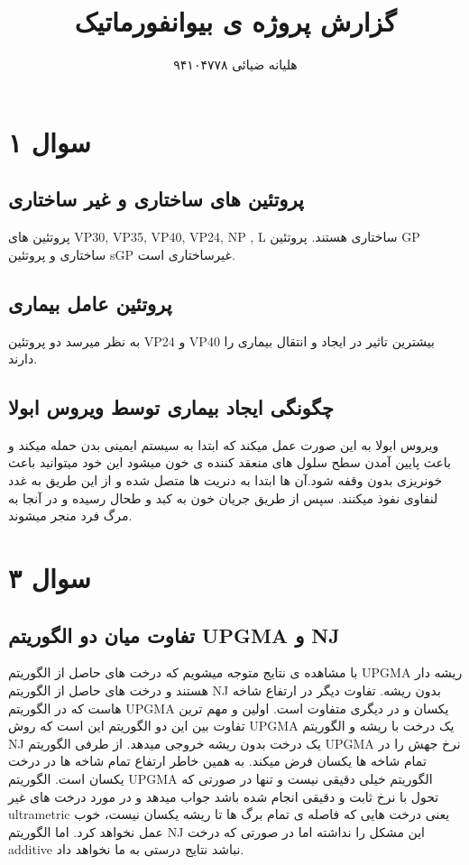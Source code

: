 \documentclass[11pt, oneside]{article}
\title{گزارش پروژه ی بیوانفورماتیک}
\author{هلیانه ضیائی	۹۴۱۰۴۷۷۸}
\begin{document}
\maketitle
\section*{سوال ۱}
\subsection*{پروتئین های ساختاری و غیر ساختاری}
پروتئين های VP30, VP35, VP40, VP24, NP , L ساختاری هستند.
\hyperlink{}{\cite{a6, a8}}
پروتئین GP ساختاری و پروتئین sGP غیرساختاری است.
\cite{a7}
\subsection*{پروتئین عامل بیماری}
به نظر میرسد دو پروتئین VP24 و VP40 بیشترین تاثیر در ایجاد و انتقال بیماری را دارند.
\hyperlink{}{\cite{a9, a8}}
\subsection*{چگونگی ایجاد بیماری توسط ویروس ابولا}
ویروس ابولا به این صورت عمل میکند که ابتدا به سیستم ایمینی بدن حمله میکند و باعث پایین آمدن سطح سلول های منعقد کننده ی خون میشود این خود میتوانید باعث خونریزی بدون وقفه شود.آن ها ابتدا به دنریت ها متصل شده و از این طریق به غدد لنفاوی نفوذ میکنند. سپس از طریق جریان خون به کبد و طحال رسیده و در آنجا به مرگ فرد منجر میشوند.
\hyperlink{}{\cite{a10, a11}}
\section*{سوال ۳}
\subsection*{تفاوت میان دو الگوریتم UPGMA و NJ}
با مشاهده ی نتایج متوجه میشویم که درخت های حاصل از الگوریتم UPGMA ریشه دار هستند و درخت های حاصل از الگوریتم NJ بدون ریشه. تفاوت دیگر در ارتفاع شاخه هاست که در الگوریتم UPGMA یکسان و در دیگری متفاوت است.
اولین و مهم ترین تفاوت بین این دو الگوریتم این است که روش UPGMA یک درخت با ریشه و الگوریتم NJ یک درخت بدون ریشه خروجی میدهد. از طرفی الگوریتم UPGMA نرخ جهش را در تمام شاخه ها یکسان فرض میکند. به همین خاطر ارتفاع تمام شاخه ها در درخت یکسان است.
الگوریتم UPGMA الگوریتم خیلی دقیقی نیست و تنها در صورتی که تحول با نرخ ثابت و دقیقی انجام شده باشد جواب میدهد و در مورد درخت های غیر ultrametric یعنی درخت هایی که فاصله ی تمام برگ ها تا ریشه یکسان نیست، خوب عمل نخواهد کرد. اما الگوریتم NJ این مشکل را نداشته اما در صورتی که درخت additive نباشد نتایج درستی به ما نخواهد داد.
\hyperlink{}{\cite{a1,a2}}
\end{document}
